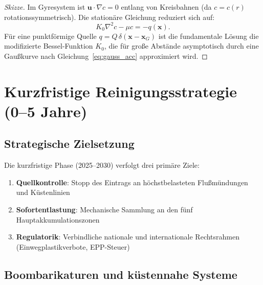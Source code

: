 ﻿\documentclass[12pt,a4paper]{article}
\theoremstyle{definition}
\theoremstyle{remark}
\begin{document}
\begin{proof}[Skizze]
Im Gyresystem ist $\mathbf{u} \cdot \nabla c = 0$ entlang von Kreisbahnen
(da $c = c(r)$ rotationssymmetrisch). Die stationäre Gleichung reduziert sich auf:
\begin{equation}
  K_0 \nabla^2 c - \mu c = -q(\mathbf{x}).
\end{equation}
F\"ur eine punktf\"ormige Quelle $q = Q\,\delta(\mathbf{x} - \mathbf{x}_G)$
ist die fundamentale L\"osung die modifizierte Bessel-Funktion $K_0$, die f\"ur
große Abst\"ande asymptotisch durch eine Gau\ss{}kurve nach Gleichung~\eqref{eq:gauss_acc}
approximiert wird.
\end{proof}

\section{Kurzfristige Reinigungsstrategie (0--5 Jahre)}
\label{sec:kurzfristig}

\subsection{Strategische Zielsetzung}

Die kurzfristige Phase (2025--2030) verfolgt drei prim\"are Ziele:
\begin{enumerate}
  \item \textbf{Quellkontrolle}: Stopp des Eintrags an h\"ochstbelasteten
        Flu\ss{}m\"undungen und K\"ustenlinien
  \item \textbf{Sofortentlastung}: Mechanische Sammlung an den f\"unf
        Hauptakkumulationszonen
  \item \textbf{Regulatorik}: Verbindliche nationale und internationale
        Rechtsrahmen (Einwegplastikverbote, EPP-Steuer)
\end{enumerate}

\subsection{Boombarikaturen und k\"ustennahe Systeme}
\end{document}
